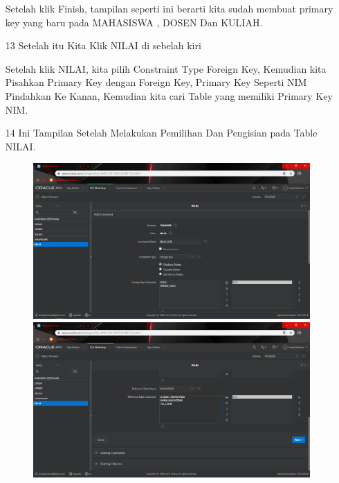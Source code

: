 \begin{enumerate}
\par
Setelah klik Finish, tampilan seperti ini berarti kita sudah membuat primary key yang baru pada MAHASISWA , DOSEN Dan KULIAH.

\newpage
\item[13]Setelah itu Kita Klik NILAI di sebelah kiri

\par
Setelah klik NILAI, kita pilih Constraint Type Foreign Key, Kemudian kita Pisahkan Primary Key dengan Foreign Key, Primary Key Seperti NIM Pindahkan Ke Kanan, Kemudian kita cari Table yang memiliki Primary Key NIM.

\item[14]Ini Tampilan Setelah Melakukan Pemilihan Dan Pengisian pada Table NILAI.

\begin{figure}[!htbp]
    \begin{center}
    \includegraphics[scale=0.3]{figures/21.png}
    \includegraphics[scale=0.3]{figures/22.png}
    \end{center}   
    \end{figure}
    

\end{enumerate}
